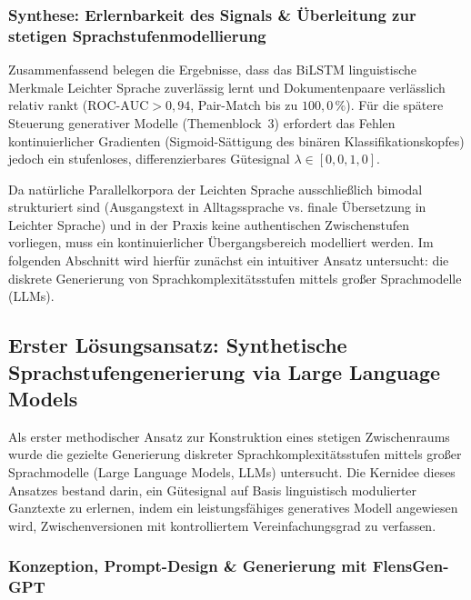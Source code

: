 \subsubsection{Synthese: Erlernbarkeit des Signals \& Überleitung zur stetigen Sprachstufenmodellierung}
\label{sec:grenzen_klassifikation_uebergang}

Zusammenfassend belegen die Ergebnisse, dass das BiLSTM linguistische Merkmale Leichter Sprache zuverlässig lernt und Dokumentenpaare verlässlich relativ rankt ($\text{ROC-AUC} > 0{,}94$, Pair-Match bis zu $100{,}0\,\%$). Für die spätere Steuerung generativer Modelle (Themenblock~3) erfordert das Fehlen kontinuierlicher Gradienten (Sigmoid-Sättigung des binären Klassifikationskopfes) jedoch ein stufenloses, differenzierbares Gütesignal $\lambda \in [0{,}0, 1{,}0]$.

Da natürliche Parallelkorpora der Leichten Sprache ausschließlich bimodal strukturiert sind (Ausgangstext in Alltagssprache vs. finale Übersetzung in Leichter Sprache) und in der Praxis keine authentischen Zwischenstufen vorliegen, muss ein kontinuierlicher Übergangsbereich modelliert werden. Im folgenden Abschnitt wird hierfür zunächst ein intuitiver Ansatz untersucht: die diskrete Generierung von Sprachkomplexitätsstufen mittels großer Sprachmodelle (LLMs).


\subsection{Erster Lösungsansatz: Synthetische Sprachstufengenerierung via Large Language Models}
\label{sec:synthetische_sprachstufen}

Als erster methodischer Ansatz zur Konstruktion eines stetigen Zwischenraums wurde die gezielte Generierung diskreter Sprachkomplexitätsstufen mittels großer Sprachmodelle (Large Language Models, LLMs) untersucht. Die Kernidee dieses Ansatzes bestand darin, ein Gütesignal auf Basis linguistisch modulierter Ganztexte zu erlernen, indem ein leistungsfähiges generatives Modell angewiesen wird, Zwischenversionen mit kontrolliertem Vereinfachungsgrad zu verfassen.

\subsubsection{Konzeption, Prompt-Design \& Generierung mit FlensGen-GPT}
\label{sec:synthetische_generierung}

